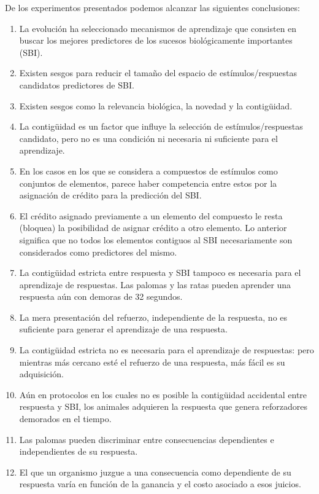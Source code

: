 \documentclass[
  letterpaper,
]{book}
\begin{document}
De los experimentos presentados podemos alcanzar las siguientes
conclusiones:

\begin{enumerate}
\def\labelenumi{\arabic{enumi}.}
\item
  La evolución ha seleccionado mecanismos de aprendizaje que consisten
  en buscar los mejores predictores de los sucesos biológicamente
  importantes (SBI).
\item
  Existen sesgos para reducir el tamaño del espacio de
  estímulos/respuestas candidatos predictores de SBI.
\item
  Existen sesgos como la relevancia biológica, la novedad y la
  contigüidad.
\item
  La contigüidad es un factor que influye la selección de
  estímulos/respuestas candidato, pero no es una condición ni necesaria
  ni suficiente para el aprendizaje.
\item
  En los casos en los que se considera a compuestos de estímulos como
  conjuntos de elementos, parece haber competencia entre estos por la
  asignación de crédito para la predicción del SBI.
\item
  El crédito asignado previamente a un elemento del compuesto le resta
  (bloquea) la posibilidad de asignar crédito a otro elemento. Lo
  anterior significa que no todos los elementos contiguos al SBI
  necesariamente son considerados como predictores del mismo.
\item
  La contigüidad estricta entre respuesta y SBI tampoco es necesaria
  para el aprendizaje de respuestas. Las palomas y las ratas pueden
  aprender una respuesta aún con demoras de 32 segundos.
\item
  La mera presentación del refuerzo, independiente de la respuesta, no
  es suficiente para generar el aprendizaje de una respuesta.
\item
  La contigüidad estricta no es necesaria para el aprendizaje de
  respuestas: pero mientras más cercano esté el refuerzo de una
  respuesta, más fácil es su adquisición.
\item
  Aún en protocolos en los cuales no es posible la contigüidad
  accidental entre respuesta y SBI, los animales adquieren la respuesta
  que genera reforzadores demorados en el tiempo.
\item
  Las palomas pueden discriminar entre consecuencias dependientes e
  independientes de su respuesta.
\item
  El que un organismo juzgue a una consecuencia como dependiente de su
  respuesta varía en función de la ganancia y el costo asociado a esos
  juicios.
\end{enumerate}
\end{document}
